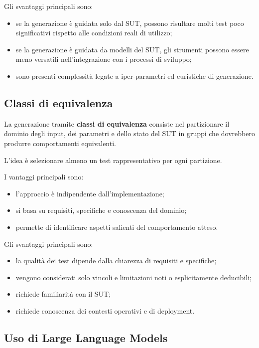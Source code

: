 Gli svantaggi principali sono:

\begin{itemize}
    \item se la generazione è guidata solo dal SUT, possono risultare molti test poco significativi rispetto alle condizioni reali di utilizzo;
    \item se la generazione è guidata da modelli del SUT, gli strumenti possono essere meno versatili nell'integrazione con i processi di sviluppo;
    \item sono presenti complessità legate a iper-parametri ed euristiche di generazione.
\end{itemize}

\subsection{Classi di equivalenza}

La generazione tramite \textbf{classi di equivalenza} consiste nel partizionare il dominio degli input, dei parametri e dello stato del SUT in gruppi che dovrebbero produrre comportamenti equivalenti.

L'idea è selezionare almeno un test rappresentativo per ogni partizione.

I vantaggi principali sono:

\begin{itemize}
    \item l'approccio è indipendente dall'implementazione;
    \item si basa su requisiti, specifiche e conoscenza del dominio;
    \item permette di identificare aspetti salienti del comportamento atteso.
\end{itemize}

Gli svantaggi principali sono:

\begin{itemize}
    \item la qualità dei test dipende dalla chiarezza di requisiti e specifiche;
    \item vengono considerati solo vincoli e limitazioni noti o esplicitamente deducibili;
    \item richiede familiarità con il SUT;
    \item richiede conoscenza dei contesti operativi e di deployment.
\end{itemize}

\subsection{Uso di Large Language Models}

